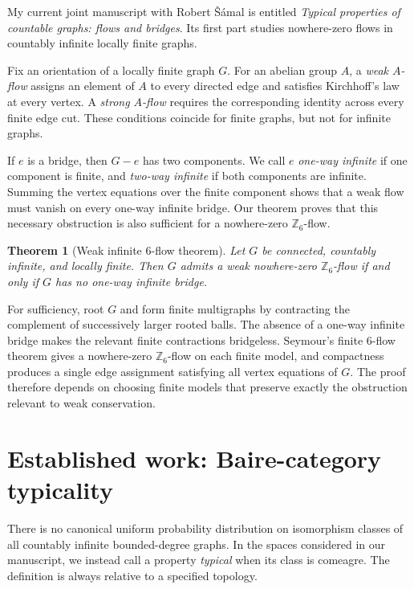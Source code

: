 \documentclass[10pt]{article}
\newcommand{\Z}{\mathbb Z}
\newtheorem{theorem}{Theorem}
\begin{document}
My current joint manuscript with Robert \v{S}\'amal is entitled
\emph{Typical properties of countable graphs: flows and bridges}.  Its first part
studies nowhere-zero flows in countably infinite locally finite graphs.

Fix an orientation of a locally finite graph $G$.  For an abelian group $A$, a
\emph{weak $A$-flow} assigns an element of $A$ to every directed edge and satisfies
Kirchhoff's law at every vertex.  A \emph{strong $A$-flow} requires the corresponding
identity across every finite edge cut.  These conditions coincide for finite graphs,
but not for infinite graphs.

If $e$ is a bridge, then $G-e$ has two components.  We call $e$ \emph{one-way
infinite} if one component is finite, and \emph{two-way infinite} if both components
are infinite.  Summing the vertex equations over the finite component shows that a
weak flow must vanish on every one-way infinite bridge.  Our theorem proves that this
necessary obstruction is also sufficient for a nowhere-zero $\Z_6$-flow.

\begin{theorem}[Weak infinite $6$-flow theorem]
Let $G$ be connected, countably infinite, and locally finite.  Then $G$ admits a weak
nowhere-zero $\Z_6$-flow if and only if $G$ has no one-way infinite bridge.
\end{theorem}

For sufficiency, root $G$ and form finite multigraphs by contracting the complement
of successively larger rooted balls.  The absence of a one-way infinite bridge makes
the relevant finite contractions bridgeless.  Seymour's finite $6$-flow theorem gives
a nowhere-zero $\Z_6$-flow on each finite model, and compactness produces a single
edge assignment satisfying all vertex equations of $G$.  The proof therefore depends
on choosing finite models that preserve exactly the obstruction relevant to weak
conservation.

\section{Established work: Baire-category typicality}

There is no canonical uniform probability distribution on isomorphism classes of all
countably infinite bounded-degree graphs.  In the spaces considered in our manuscript,
we instead call a property \emph{typical} when its class is comeagre.  The definition is
always relative to a specified topology.
\end{document}
